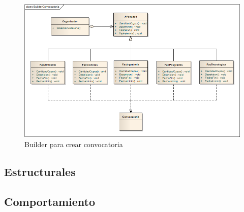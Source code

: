 \begin{figure}[th!]
	\centering
	\includegraphics[width=1.2\linewidth]{uml/Patrones/BuilderConvocatoria}
	\caption{Builder para crear convocatoria}
	\label{fig:Builder para convocatoria}
\end{figure}

\newpage

\subsection{Estructurales}

\subsection{Comportamiento}




